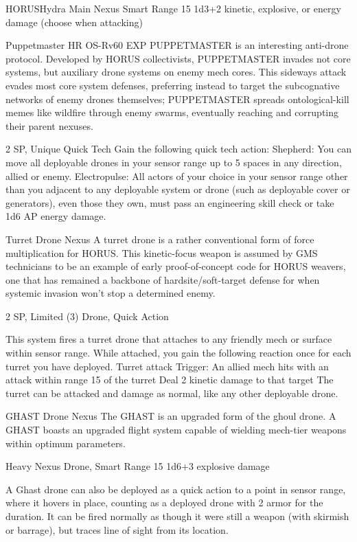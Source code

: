 \begin{mech}{HORUS}{Hydra}
Main Nexus
Smart
Range 15
1d3+2 kinetic, explosive, or energy damage (choose when attacking)

Puppetmaster
HR OS-Rv60 EXP PUPPETMASTER is an interesting anti-drone protocol. Developed by HORUS collectivists, PUPPETMASTER invades not core systems, but auxiliary drone systems on enemy mech cores. This sideways attack evades most core system defenses, preferring instead to target the subcognative networks of enemy drones themselves; PUPPETMASTER spreads ontological-kill memes like wildfire through enemy swarms, eventually reaching and corrupting their parent nexuses.

2 SP, Unique
Quick Tech
Gain the following quick tech action:
Shepherd: You can move all deployable drones in your sensor range up to 5 spaces in any direction, allied or enemy.
Electropulse: All actors of your choice in your sensor range other than you adjacent to any deployable system or drone (such as deployable cover or generators), even those they own, must pass an engineering skill check or take 1d6 AP energy damage.

Turret Drone Nexus
A turret drone is a rather conventional form of force multiplication for HORUS. This kinetic-focus weapon is assumed by GMS technicians to be an example of early proof-of-concept code for HORUS weavers, one that has remained a backbone of hardsite/soft-target defense for when systemic invasion won’t stop a determined enemy.

2 SP, Limited (3)
Drone, Quick Action

This system fires a turret drone that attaches to any friendly mech or surface within sensor range. While attached, you gain the following reaction once for each turret you have deployed.
	Turret attack
	Trigger: An allied mech hits with an attack within range 15 of the turret
	Deal 2 kinetic damage to that target
The turret can be attacked and damage as normal, like any other deployable drone.

GHAST Drone Nexus
The GHAST is an upgraded form of the ghoul drone. A GHAST boasts an upgraded flight system capable of wielding mech-tier weapons within optimum parameters.

Heavy Nexus
Drone, Smart
Range 15
1d6+3 explosive damage

A Ghast drone can also be deployed as a quick action to a point in sensor range, where it hovers in place, counting as a deployed drone with 2 armor for the duration. It can be fired normally as though it were still a weapon (with skirmish or barrage), but traces line of sight from its location.


\end{mech}
